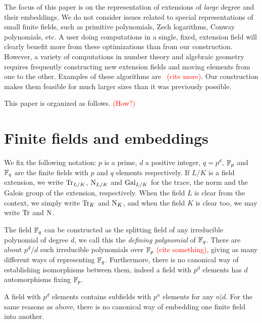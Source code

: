 \documentclass{sig-alternate}
\newcommand{\todo}[1]{\textcolor{red}{(#1)}}
\begin{document}
The focus of this paper is on the representation of extensions of
\emph{large} degree and their embeddings. We do not consider issues
related to special representations of small finite fields, such as
primitive polynomials, Zech logarithms, Conway polynomials, etc. A
user doing computations in a single, fixed, extension field will
clearly benefit more from these optimizations than from our
construction. However, a variety of computations in number theory and
algebraic geometry requires frequently constructing new extension
fields and moving elements from one to the other. Examples of these
algorithms are~\cite{df10} \todo{cite more}. Our construction makes
them feasible for much larger sizes than it was previously possible.

This paper is organized as follows. \todo{How?}


\section{Finite fields and embeddings}
\label{sec:finite-field-embedd}
We fix the following notation: $p$ is a prime, $d$ a positive integer,
$q=p^d$, $\mathbb{F}_p$ and $\mathbb{F}_q$ are the finite fields with $p$ and $q$
elements respectively. If $L/K$ is a field extension, we write
$\operatorname{Tr}_{L/K}$, $\operatorname{N}_{L/K}$ and $\operatorname{Gal}_{L/K}$ for the trace, the norm
and the Galois group of the extension, respectively. When the field
$L$ is clear from the context, we simply write $\operatorname{Tr}_K$ and $\operatorname{N}_K$,
and when the field $K$ is clear too, we may write $\operatorname{Tr}$ and $\operatorname{N}$.

The field $\mathbb{F}_q$ can be constructed as the splitting field of any
irreducible polynomial of degree $d$, we call this the \emph{defining
  polynomial} of $\mathbb{F}_q$. There are about $p^d/d$ such irreducible
polynomials over $\mathbb{F}_p$ \todo{cite something}, giving as many
different ways of representing $\mathbb{F}_q$. Furthermore, there is no
canonical way of establishing isomorphisms between them, indeed a
field with $p^d$ elements has $d$ automorphisms fixing $\mathbb{F}_p$.

A field with $p^d$ elements contains subfields with $p^n$ elements for
any $n|d$. For the same reasons as above, there is no canonical way of
embedding one finite field into another.
\end{document}
